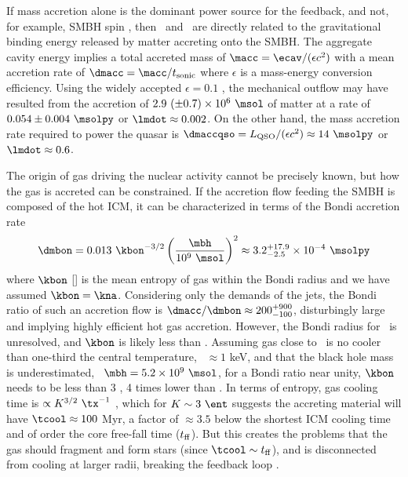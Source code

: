 \documentclass[useAMS,usenatbib]{mn2e}
\begin{document}
If mass accretion alone is the dominant power source for the feedback,
and not, for example, SMBH spin \citep{2002NewAR..46..247M, minaspin},
then \pcav\ and \lqso\ are directly related to the gravitational
binding energy released by matter accreting onto the SMBH. The
aggregate cavity energy implies a total accreted mass of $\macc =
\ecav/(\epsilon c^2)$ with a mean accretion rate of $\dmacc =
\macc/t_{\rm{sonic}}$ where $\epsilon$ is a mass-energy conversion
efficiency. Using the widely accepted $\epsilon = 0.1$
\citep{2002apa..book.....F}, the mechanical outflow may have resulted
from the accretion of $2.9 ~(\pm 0.7) \times 10^{6} ~\msol$ of matter
at a rate of $0.054 \pm 0.004 ~\msolpy$ or $\lmdot \approx 0.002$. On
the other hand, the mass accretion rate required to power the quasar
is $\dmaccqso = \lqso/(\epsilon c^2) \approx 14 ~\msolpy$ or $\lmdot
\approx 0.6$.

The origin of gas driving the nuclear activity cannot be precisely
known, but how the gas is accreted can be constrained. If the
accretion flow feeding the SMBH is composed of the hot ICM, it can be
characterized in terms of the Bondi accretion rate
\begin{equation}
  \dmbon = 0.013 ~\kbon^{-3/2} \left(\frac{\mbh}{10^9
    ~\msol}\right)^{2} \approx 3.2^{+17.9}_{-2.5} \times 10^{-4}
  ~\msolpy
\end{equation}
where $\kbon$ [\ent] is the mean entropy of gas within the Bondi
radius and we have assumed $\kbon = \kna$. Considering only the
demands of the jets, the Bondi ratio of such an accretion flow is
$\dmacc/\dmbon \approx 200^{+900}_{-100}$, disturbingly large and
implying highly efficient hot gas accretion. However, the Bondi radius
for \irs\ is unresolved, and $\kbon$ is likely less than
\kna. Assuming gas close to \rbon\ is no cooler than one-third the
central temperature, \ie\ $\approx 1$ keV, and that the black hole
mass is underestimated, \ie\ $\mbh = 5.2 \times 10^9 ~\msol$, for a
Bondi ratio near unity, $\kbon$ needs to be less than 3 \ent, 4 times
lower than \kna. In terms of entropy, gas cooling time is $\propto
K^{3/2} ~\tx^{-1}$ \citep{d06}, which for $K \sim 3 ~\ent$ suggests
the accreting material will have $\tcool \approx 100$ Myr, a factor of
$\approx 3.5$ below the shortest ICM cooling time and of order the
core free-fall time ($t_{\rm{ff}}$). But this creates the problems
that the gas should fragment and form stars (since $\tcool \sim
t_{\rm{ff}}$), and is disconnected from cooling at larger radii,
breaking the feedback loop \citep{2006NewA...12...38S}.
\end{document}
